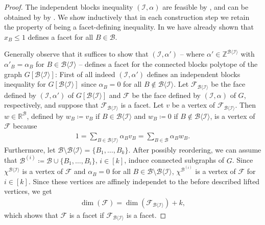 \documentclass[12pt]{amsart}
\newcommand{\Z}{\mathbb{Z}}
\newcommand{\R}{\mathbb{R}}
\newcommand{\I}{\mathcal{I}}
\newcommand{\B}{\mathcal{B}}
\newcommand{\F}{\mathcal{F}}
\begin{document}
\begin{proof}
    The independent blocks inequality $(\I,\alpha)$ are feasible by , and can be obtained by  by . We show inductively that in each construction step we retain the property of being a facet-defining inequality. In  we have already shown that $x_B \le 1$ defines a facet for all $B \in \B$.
    
    Generally observe that it suffices to show that $(\I,\alpha')$ -- where $\alpha'\in \Z^{\B\langle\I\rangle}$ with $\alpha'_B=\alpha_B$ for $B \in \B\langle\I\rangle$ -- defines a facet for the connected blocks polytope of the graph $G[\B\langle\I\rangle]$: First of all indeed $(\I,\alpha')$ defines an independent blocks inequality for $G[\B\langle\I\rangle]$ since $\alpha_B=0$ for all $B \notin \B\langle\I\rangle$. Let $\F_{\B\langle\I\rangle}$ be the face defined by $(\I,\alpha')$ of $G[\B\langle\I\rangle]$ and $\F$ be the face defined by $(\I,\alpha)$ of $G$, respectively, and suppose that $\F_{\B\langle\I\rangle}$ is a facet. Let $v$ be a vertex of $\F_{\B\langle\I\rangle}$. Then $w \in \R^\B$, defined by $w_B\coloneqq v_B$ if $B \in \B\langle\I\rangle$ and $w_B\coloneqq 0$ if $B \notin \B\langle \I \rangle$, is a vertex of $\F$ because
    \begin{align*}
        1=\sum_{B \in \B\langle \I\rangle}\alpha_Bv_B=\sum_{B \in \B}\alpha_Bw_B.
    \end{align*}
    Furthermore, let $\B \setminus \B\langle\I\rangle=\{B_1,\ldots,B_k\}$. After possibly reordering, we can assume that $\B^{(i)}\coloneqq \B \cup \{B_1,\ldots,B_i\}$, $i \in [k]$, induce connected subgraphs of $G$. Since $\chi^{\B\langle \I \rangle}$ is a vertex of $\F$ and $\alpha_B=0$ for all $B \in \B \setminus \B \langle \I \rangle$, $\chi^{\B^{(i)}}$ is a vertex of $\F$ for $i \in [k]$. Since these vertices are affinely independet to the before described lifted vertices, we get
    \begin{align*}
        \dim(\F)=\dim(\F_{\B\langle\I\rangle})+k,
    \end{align*}
    which shows that $\F$ is a facet if $\F_{\B\langle\I\rangle}$ is a facet.
    

\end{proof}
\end{document}
